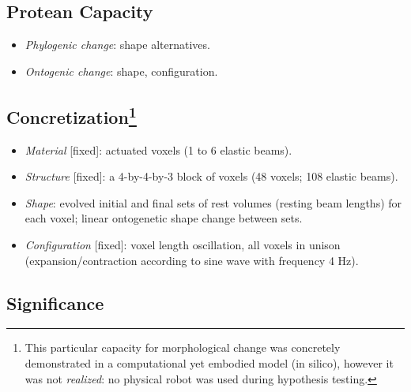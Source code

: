 \subsection{Protean Capacity}

\begin{itemize}
    \item \textit{Phylogenic change}: shape alternatives.
    \item \textit{Ontogenic change}: shape, configuration.
\end{itemize}


\subsection[Concretization]{Concretization\footnote{This particular capacity for morphological change was concretely demonstrated in a computational yet embodied model (in silico), however it was not \textit{realized}: no physical robot was used during hypothesis testing.}}

\begin{itemize}
    \item \textit{Material} [fixed]: actuated voxels (1 to 6 elastic beams).
    \item \textit{Structure} [fixed]: a 4-by-4-by-3 block of voxels (48 voxels; 108 elastic beams).
    \item \textit{Shape}: evolved initial and final sets of rest volumes (resting beam lengths) for each voxel; linear ontogenetic shape change between sets.
    \item \textit{Configuration} [fixed]: voxel length oscillation, all voxels in unison (expansion/contraction according to sine wave with frequency 4 Hz).
\end{itemize}


\subsection{Significance}







